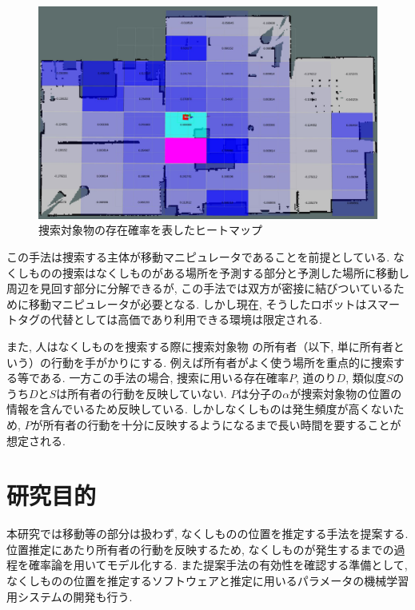 \begin{figure}[H]
    \begin{center}
        \includegraphics[width=0.8\linewidth]{figs/kusano.jpg}
        \caption{捜索対象物の存在確率を表したヒートマップ\cite{kusano}}%
        \label{fig:kusano}
    \end{center}
\end{figure}

この手法は捜索する主体が移動マニピュレータであることを前提としている. 
なくしものの捜索はなくしものがある場所を予測する部分と予測した場所に移動し周辺を見回す部分に分解できるが, 
この手法では双方が密接に結びついているために移動マニピュレータが必要となる. 
しかし現在, そうしたロボットはスマートタグの代替としては高価であり利用できる環境は限定される. 

また, 人はなくしものを捜索する際に捜索対象物
の所有者（以下, 単に所有者という）の行動を手がかりにする. 
例えば所有者がよく使う場所を重点的に捜索する等である. 
一方この手法の場合, 捜索に用いる存在確率$P$, 道のり$D$, 類似度$S$のうち$D$と$S$は所有者の行動を反映していない. 
$P$は分子の$\alpha$が捜索対象物の位置の情報を含んでいるため反映している. 
しかしなくしものは発生頻度が高くないため, $P$が所有者の行動を十分に反映するようになるまで長い時間を要することが想定される. 


\section{研究目的}
本研究では移動等の部分は扱わず, なくしものの位置を推定する手法を提案する. 
位置推定にあたり所有者の行動を反映するため, なくしものが発生するまでの過程を確率論を用いてモデル化する. 
また提案手法の有効性を確認する準備として, なくしものの位置を推定するソフトウェアと推定に用いるパラメータの機械学習用システムの開発も行う. 
